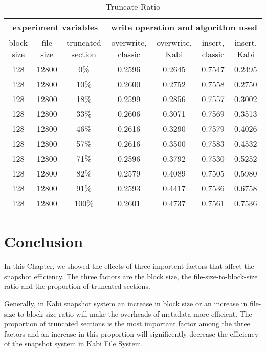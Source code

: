 \begin{lscape} 
\begin{table}
\caption{Truncate Ratio}
\label{tab:truncate_ratio}
\begin{center}
\begin{tabular}{|c|c|c|c|c|c|c|}
\hline
\multicolumn{3}{|c|}{experiment variables} & \multicolumn{4}{c|}{write operation and algorithm used} \\
\hline
block size & file size & truncated section & overwrite, classic & overwrite, Kabi & insert, classic & insert, Kabi\\
\hline
128 & 12800 & 0\% & 0.2596 & 0.2645 & 0.7547 & 0.2495 \\
\hline
128 & 12800 & 10\% & 0.2600 & 0.2752 & 0.7558 & 0.2750 \\
\hline
128 & 12800 & 18\% & 0.2599 & 0.2856 & 0.7557 & 0.3002 \\
\hline
128 & 12800 & 33\% & 0.2606 & 0.3071 & 0.7569 & 0.3513 \\
\hline
128 & 12800 & 46\% & 0.2616 & 0.3290 & 0.7579 & 0.4026 \\
\hline
128 & 12800 & 57\% & 0.2616 & 0.3500 & 0.7583 & 0.4532 \\
\hline
128 & 12800 & 71\% & 0.2596 & 0.3792 & 0.7530 & 0.5252 \\
\hline
128 & 12800 & 82\% & 0.2579 & 0.4089 & 0.7505 & 0.5980 \\
\hline
128 & 12800 & 91\% & 0.2593 & 0.4417 & 0.7536 & 0.6758 \\
\hline
128 & 12800 & 100\% & 0.2601 & 0.4737 & 0.7561 & 0.7536 \\
\hline
\end{tabular}
\end{center}
\end{table}
\end{lscape}

\section{Conclusion}

    In this Chapter, we showed the effects of three importent factors that affect the snapshot efficiency. The three factors are the block size, the file-size-to-block-size ratio and the proportion of truncated sections.

    Generally, in Kabi snapshot system an increase in block size or an increase in file-size-to-block-size ratio will make the overheads of metadata more efficient. The proportion of truncated sections is the most important factor among the three factors and an increase in this proportion will significently decrease the efficiency of the snapshot system in Kabi File System.
